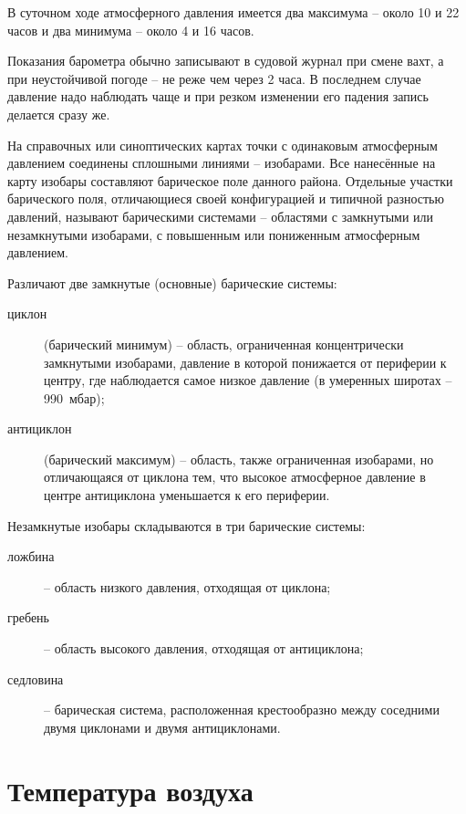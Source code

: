 В суточном ходе атмосферного давления имеется два максимума \--- около
10 и 22 часов и два минимума \--- около 4 и 16 часов.

Показания барометра обычно записывают в судовой журнал при смене вахт,
а при неустойчивой погоде \--- не реже чем через 2 часа. В последнем
случае давление надо наблюдать чаще и при резком изменении его падения
запись делается сразу же.

На справочных или синоптических картах точки с одинаковым атмосферным
давлением соединены сплошными линиями \--- изобарами. Все нанесённые
на карту изобары составляют барическое поле данного района. Отдельные
участки барического поля, отличающиеся своей конфигурацией и типичной
разностью давлений, называют барическими системами \--- областями с
замкнутыми или незамкнутыми изобарами, с повышенным или пониженным
атмосферным давлением.

Различают две замкнутые (основные) барические системы:

\begin{description}
\item[циклон]   (барический минимум) \--- область, ограниченная
  концентрически замкнутыми изобарами, давление в которой понижается
  от периферии к центру, где наблюдается самое низкое давление (в
  умеренных широтах \--- 990~мбар);
\item[антициклон]   (барический максимум) \--- область, также
  ограниченная изобарами, но отличающаяся от циклона тем, что высокое
  атмосферное давление в центре антициклона уменьшается к его
  периферии.
\end{description}

Незамкнутые изобары складываются в три барические системы:

\begin{description}
\item[ложбина] \--- область низкого давления, отходящая от циклона; 
\item[гребень] \--- область высокого давления, отходящая от антициклона; 
\item[седловина] \--- барическая система, расположенная крестообразно между соседними двумя циклонами и двумя антициклонами.
\end{description}

\section{Температура воздуха}

